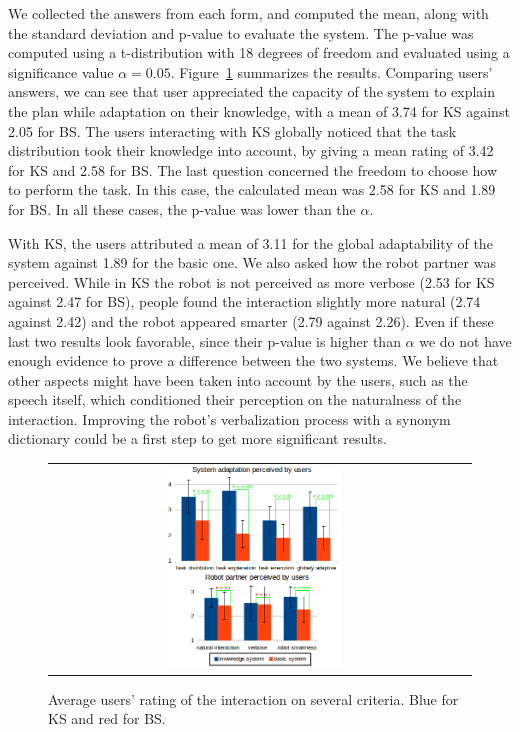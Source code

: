 We collected the answers from each form, and computed the mean, along with the standard deviation and p-value to evaluate the system. The p-value was computed using a t-distribution with 18 degrees of freedom and evaluated using a significance value $\alpha=0.05$.
Figure~\ref{fig:plan_management-results} summarizes the results. Comparing users' answers, we can see that user appreciated the capacity of the system to explain the plan while  adaptation on their knowledge, with a mean of 3.74 for KS against 2.05 for BS. The users interacting with KS globally noticed that the task distribution took their knowledge into account, by giving a mean rating of 3.42 for KS and 2.58 for BS. The last question concerned the freedom to choose how to perform the task. In this case, the calculated mean was 2.58 for KS and 1.89 for BS. In all these cases, the p-value was lower than the $\alpha$. 

With KS, the users attributed a mean of 3.11 for the global adaptability of the system against 1.89 for the basic one.
We also asked how the robot partner was perceived. While in KS the robot is not perceived as more verbose (2.53 for KS against 2.47 for BS), people found the interaction slightly more natural (2.74 against 2.42) and the robot appeared smarter (2.79 against 2.26). Even if these last two results look favorable, since their p-value is higher than $\alpha$  we do not have enough evidence to prove a difference between the two systems. We believe that other aspects might have been taken into account by the users, such as the speech itself, which conditioned their perception on the naturalness of the interaction. Improving the robot's verbalization process with a synonym dictionary could be a first step to get more significant results.



 \begin{figure}[ht!]
 \centering
 \begin{tabular}{cc}
  \includegraphics[width=0.45\textwidth]{img/plan_management/respvalue3.png}
 \end{tabular}
 \caption{Average users' rating of the interaction on several criteria. Blue for KS and red for BS.}
 \label{fig:plan_management-results}
 \end{figure}

